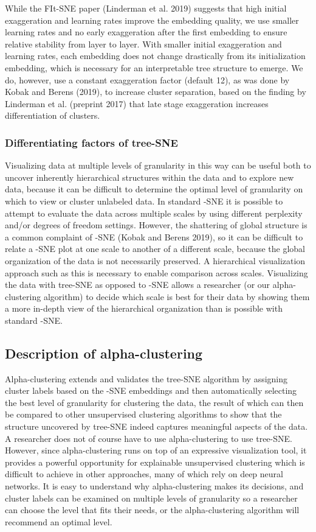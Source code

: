 \documentclass{article}
\begin{document}
While the FIt-SNE paper (Linderman et al. 2019) suggests that high initial exaggeration and learning rates improve the embedding quality, we use smaller learning rates and no early exaggeration after the first embedding to ensure relative stability from layer to layer. With smaller initial exaggeration and learning rates, each embedding does not change drastically from its initialization embedding, which is necessary for an interpretable tree structure to emerge. We do, however, use a constant exaggeration factor (default 12), as was done by Kobak and Berens (2019), to increase cluster separation, based on the finding by Linderman et al. (preprint 2017) that late stage exaggeration increases differentiation of clusters. 

\subsubsection{Differentiating factors of tree-SNE}

Visualizing data at multiple levels of granularity in this way can be useful both to uncover inherently hierarchical structures within the data and to explore new data, because it can be difficult to determine the optimal level of granularity on which to view or cluster unlabeled data. In standard -SNE it is possible to attempt to evaluate the data across multiple scales by using different perplexity and/or degrees of freedom settings. However, the shattering of global structure is a common complaint of -SNE (Kobak and Berens 2019), so it can be difficult to relate a -SNE plot at one scale to another of a different scale, because the global organization of the data is not necessarily preserved. A hierarchical visualization approach such as this is necessary to enable comparison across scales. Visualizing the data with tree-SNE as opposed to -SNE allows a researcher (or our alpha-clustering algorithm) to decide which scale is best for their data by showing them a more in-depth view of the hierarchical organization than is possible with standard -SNE.

\subsection{Description of alpha-clustering}

Alpha-clustering extends and validates the tree-SNE algorithm by assigning cluster labels based on the -SNE embeddings and then automatically selecting the best level of granularity for clustering the data, the result of which can then be compared to other unsupervised clustering algorithms to show that the structure uncovered by tree-SNE indeed captures meaningful aspects of the data. A researcher does not of course have to use alpha-clustering to use tree-SNE. However, since alpha-clustering runs on top of an expressive visualization tool, it provides a powerful opportunity for explainable unsupervised clustering which is difficult to achieve in other approaches, many of which rely on deep neural networks. It is easy to understand why alpha-clustering makes its decisions, and cluster labels can be examined on multiple levels of granularity so a researcher can choose the level that fits their needs, or the alpha-clustering algorithm will recommend an optimal level.
\end{document}
